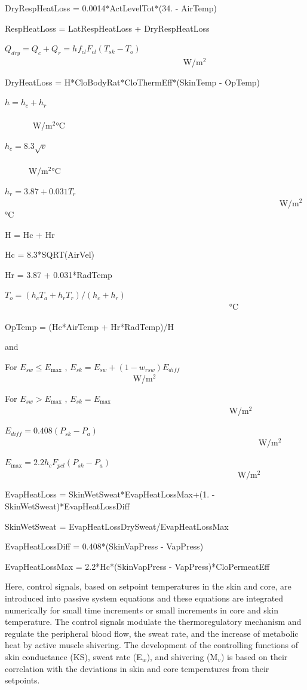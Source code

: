 DryRespHeatLoss = 0.0014*ActLevelTot*(34. - AirTemp)

RespHeatLoss = LatRespHeatLoss + DryRespHeatLoss

\({Q_{dry}} = {Q_c} + {Q_r} = {h_{}}{f_{cl}}{F_{cl}}({T_{sk}} - {T_o})\) ~~~~~~~~~~~~~~~~~~~~~~~~~~~~~~~~~~~~~~~~~~ W/m\(^{2}\)

DryHeatLoss = H*CloBodyRat*CloThermEff*(SkinTemp - OpTemp)

\(h = {h_c} + {h_r}\) ~~~~~~~~~~~~~~~~~~~~~~~~~~~~~~~~~~~~~~~~~~~~~~~~~~~~~~~~~~~~~~~~~~~~~~~~~~~~~~ W/m\(^{2}\)°C

\({h_c} = 8.3\sqrt v\) ~~~~~~~~~~~~~~~~~~~~~~~~~~~~~~~~~~~~~~~~~~~~~~~~~~~~~~~~~~~~~~~~~~~~~~~~~~~~~ W/m\(^{2}\)°C

\({h_r} = 3.87 + 0.031{T_r}\) ~~~~~~~~~~~~~~~~~~~~~~~~~~~~~~~~~~~~~~~~~~~~~~~~~~~~~~~~~~~~~~~~~ W/m\(^{2}\)°C

H = Hc + Hr

Hc = 8.3*SQRT(AirVel)

Hr = 3.87 + 0.031*RadTemp

\({T_o} = ({h_c}{T_a} + {h_r}{T_r})/({h_c} + {h_r})\) ~~~~~~~~~~~~~~~~~~~~~~~~~~~~~~~~~~~~~~~~~~~~~~~~~~~~~ °C

OpTemp = (Hc*AirTemp + Hr*RadTemp)/H

and

For \({E_{sw}} \le {E_{\max }}\) , \({E_{sk}} = {E_{sw}} + (1 - {w_{rsw}}){E_{diff}}\) ~~~~~~~~~~~~~~~~~~~~~~~~~~~~~~ W/m\(^{2}\)

For \({E_{sw}} > {E_{\max }}\) , \({E_{sk}} = {E_{\max }}\) ~~~~~~~~~~~~~~~~~~~~~~~~~~~~~~~~~~~~~~~~~~~~~~~~~~~~~ W/m\(^{2}\)

\({E_{diff}} = 0.408({P_{sk}} - {P_a})\) ~~~~~~~~~~~~~~~~~~~~~~~~~~~~~~~~~~~~~~~~~~~~~~~~~~~~~~~~~~~~ W/m\(^{2}\)

\({E_{\max }} = 2.2{h_c}{F_{pcl}}({P_{sk}} - {P_a})\) ~~~~~~~~~~~~~~~~~~~~~~~~~~~~~~~~~~~~~~~~~~~~~~~~~~~~~~~ W/m\(^{2}\)

EvapHeatLoss = SkinWetSweat*EvapHeatLossMax+(1. - SkinWetSweat)*EvapHeatLossDiff

SkinWetSweat = EvapHeatLossDrySweat/EvapHeatLossMax

EvapHeatLossDiff = 0.408*(SkinVapPress - VapPress)

EvapHeatLossMax = 2.2*Hc*(SkinVapPress - VapPress)*CloPermeatEff

Here, control signals, based on setpoint temperatures in the skin and core, are introduced into passive system equations and these equations are integrated numerically for small time increments or small increments in core and skin temperature. The control signals modulate the thermoregulatory mechanism and regulate the peripheral blood flow, the sweat rate, and the increase of metabolic heat by active muscle shivering. The development of the controlling functions of skin conductance (KS), sweat rate (E\(_{w}\)), and shivering (M\(_{v}\)) is based on their correlation with the deviations in skin and core temperatures from their setpoints.


